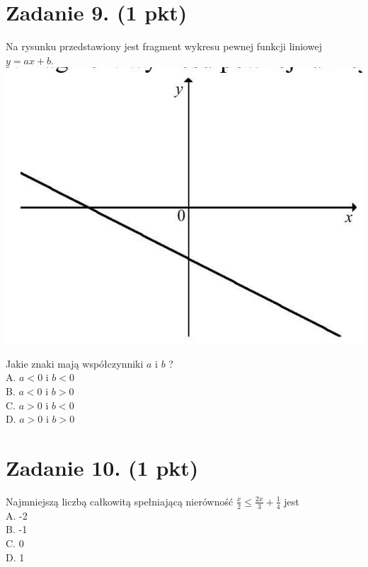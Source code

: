 \documentclass[10pt]{article}
\begin{document}
\section*{Zadanie 9. (1 pkt)}
Na rysunku przedstawiony jest fragment wykresu pewnej funkcji liniowej \(y=a x+b\).\\
\includegraphics[max width=\textwidth, center]{2024_11_21_e0e8aab895018a50a9a7g-04(1)}

Jakie znaki mają współczynniki \(a\) i \(b\) ?\\
A. \(a<0\) i \(b<0\)\\
B. \(a<0\) i \(b>0\)\\
C. \(a>0\) i \(b<0\)\\
D. \(a>0\) i \(b>0\)

\section*{Zadanie 10. (1 pkt)}
Najmniejszą liczbą całkowitą spełniającą nierówność \(\frac{x}{2} \leq \frac{2 x}{3}+\frac{1}{4}\) jest\\
A. -2\\
B. -1\\
C. 0\\
D. 1
\end{document}
